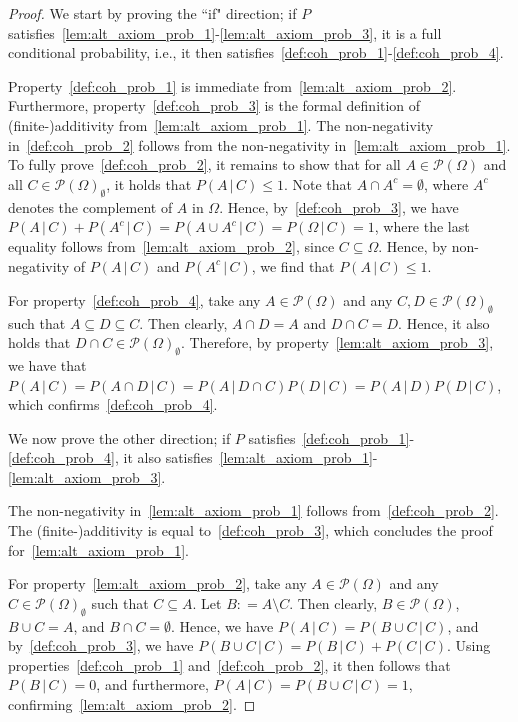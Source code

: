 \documentclass[10pt]{paper}
\theoremstyle{definition}
\newcommand{\paths}{\Omega}
\newcommand{\power}{\mathcal{P}(\paths)}
\newcommand{\nonemptypower}{\power_{\emptyset}}
\newcommand{\coloneqq}{:\!=}
\begin{document}
\begin{proof}
We start by proving the ``if" direction; if $P$ satisfies~\ref{lem:alt_axiom_prob_1}-\ref{lem:alt_axiom_prob_3}, it is a full conditional probability, i.e., it then satisfies~\ref{def:coh_prob_1}-\ref{def:coh_prob_4}.

Property~\ref{def:coh_prob_1} is immediate from~\ref{lem:alt_axiom_prob_2}. Furthermore, property~\ref{def:coh_prob_3} is the formal definition of (finite-)additivity from~\ref{lem:alt_axiom_prob_1}. The non-negativity in~\ref{def:coh_prob_2} follows from the non-negativity in~\ref{lem:alt_axiom_prob_1}. To fully prove~\ref{def:coh_prob_2}, it remains to show that for all $A\in\power$ and all $C\in\nonemptypower$, it holds that $P(A\,\vert\,C)\leq 1$. Note that $A\cap A^c=\emptyset$, where $A^c$ denotes the complement of $A$ in $\Omega$. Hence, by~\ref{def:coh_prob_3}, we have $P(A\,\vert\,C)+P(A^c\,\vert\,C)=P(A\cup A^c\,\vert\,C)=P(\Omega\,\vert\,C)=1$, where the last equality follows from~\ref{lem:alt_axiom_prob_2}, since $C\subseteq \Omega$. Hence, by non-negativity of $P(A\,\vert\,C)$ and $P(A^c\,\vert\,C)$, we find that $P(A\,\vert\,C)\leq 1$.

For property~\ref{def:coh_prob_4}, take any $A\in\power$ and any $C,D\in\nonemptypower$ such that $A\subseteq D\subseteq C$. Then clearly, $A\cap D=A$ and $D\cap C=D$. Hence, it also holds that $D\cap C\in\nonemptypower$. Therefore, by property~\ref{lem:alt_axiom_prob_3}, we have that $P(A\,\vert\,C)=P(A\cap D\,\vert\,C)=P(A\,\vert\,D\cap C)P(D\,\vert\,C)=P(A\,\vert\,D)P(D\,\vert\,C)$, which confirms~\ref{def:coh_prob_4}.

We now prove the other direction; if $P$ satisfies~\ref{def:coh_prob_1}-\ref{def:coh_prob_4}, it also satisfies~\ref{lem:alt_axiom_prob_1}-\ref{lem:alt_axiom_prob_3}.

The non-negativity in~\ref{lem:alt_axiom_prob_1} follows from~\ref{def:coh_prob_2}. The (finite-)additivity is equal to~\ref{def:coh_prob_3}, which concludes the proof for~\ref{lem:alt_axiom_prob_1}.

For property~\ref{lem:alt_axiom_prob_2}, take any $A\in\power$ and any $C\in\nonemptypower$ such that $C\subseteq A$. Let $B\coloneqq A\setminus C$. Then clearly, $B\in\power$, $B\cup C=A$, and $B\cap C=\emptyset$. Hence, we have $P(A\,\vert\,C)=P(B\cup C\,\vert\,C)$, and by~\ref{def:coh_prob_3}, we have $P(B\cup C\,\vert\,C)=P(B\,\vert\,C)+P(C\,\vert\,C)$. Using properties~\ref{def:coh_prob_1} and~\ref{def:coh_prob_2}, it then follows that $P(B\,\vert\,C)=0$, and furthermore, $P(A\,\vert\,C)=P(B\cup C\,\vert\,C)=1$, confirming~\ref{lem:alt_axiom_prob_2}. 


\end{proof}
\end{document}
